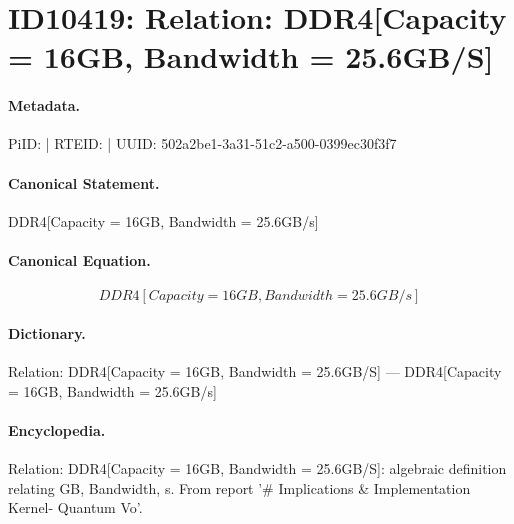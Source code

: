 \section*{ID10419: Relation: DDR4[Capacity = 16GB, Bandwidth = 25.6GB/S]}
\paragraph{Metadata.}
PiID:  | RTEID:  | UUID: 502a2be1-3a31-51c2-a500-0399ec30f3f7

\paragraph{Canonical Statement.}
DDR4[Capacity = 16GB, Bandwidth = 25.6GB/s]

\paragraph{Canonical Equation.}
\[
DDR4[Capacity = 16GB, Bandwidth = 25.6GB/s]
\]

\paragraph{Dictionary.}
Relation: DDR4[Capacity = 16GB, Bandwidth = 25.6GB/S] — DDR4[Capacity = 16GB, Bandwidth = 25.6GB/s]

\paragraph{Encyclopedia.}
Relation: DDR4[Capacity = 16GB, Bandwidth = 25.6GB/S]: algebraic definition relating GB, Bandwidth, s. From report '\# Implications \& Implementation Kernel- Quantum Vo'.
